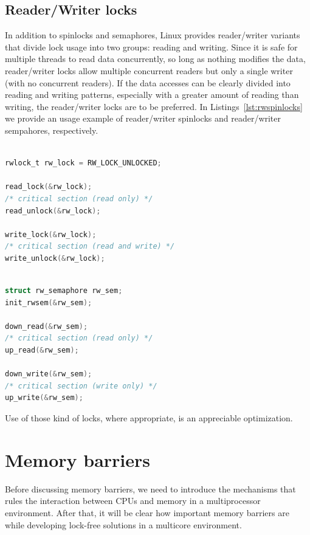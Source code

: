 \subsection{Reader/Writer locks\label{sec:rw_locks}}

In addition to spinlocks and semaphores, Linux provides reader/writer variants that divide
lock usage into two groups: reading and writing. Since it is safe for multiple threads to
read data concurrently, so long as nothing modifies the data, reader/writer locks allow
multiple concurrent readers but only a single writer (with no concurrent readers). If the
data accesses can be clearly divided into reading and writing patterns, especially with 
a greater amount of reading than writing, the reader/writer locks are to be preferred.
In Listings~\ref{lst:rwspinlocks} we provide an usage example of reader/writer spinlocks and
reader/writer sempahores, respectively.

\begin{lstlisting}[language=C, caption={Reader/Writer Spinlocks},
                        label={lst:rwspinlocks}]

rwlock_t rw_lock = RW_LOCK_UNLOCKED;

read_lock(&rw_lock);
/* critical section (read only) */
read_unlock(&rw_lock);

write_lock(&rw_lock);
/* critical section (read and write) */
write_unlock(&rw_lock);

\end{lstlisting}


\begin{lstlisting}[language=C, caption={Reader/Writer Semaphores},
			label={lst:rwsem}]

struct rw_semaphore rw_sem;
init_rwsem(&rw_sem);

down_read(&rw_sem);
/* critical section (read only) */
up_read(&rw_sem);

down_write(&rw_sem);
/* critical section (write only) */
up_write(&rw_sem);

\end{lstlisting}

Use of those kind of locks, where appropriate, is an appreciable optimization.

\section{Memory barriers\label{sec:mem_barriers}}

Before discussing memory barriers, we need to introduce the mechanisms that rules
the interaction between CPUs and memory in a multiprocessor environment.
After that, it will be clear how important memory barriers are while developing lock-free
solutions in a multicore environment.

